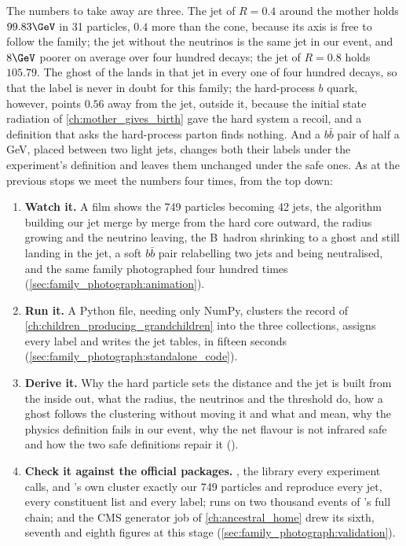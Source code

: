 The numbers to take away are three. The \antikt jet of $R=0.4$ around the
mother holds $99.83\GeV$ in 31 particles, $0.4$ more than the cone,
because its axis is free to follow the family; the jet without the
neutrinos is the same jet in our event, and $8\GeV$ poorer on average over
four hundred decays; the jet of $R=0.8$ holds $105.79$. The ghost of the
\Bbar lands in that jet in every one of four hundred decays, so that the
label is never in doubt for this family; the hard-process $b$ quark,
however, points $0.56$ away from the jet, outside it, because the initial
state radiation of \cref{ch:mother_gives_birth} gave the hard system a
recoil, and a definition that asks the hard-process parton finds nothing.
And a $b\bar b$ pair of half a GeV, placed between two light jets, changes
both their labels under the experiment's definition and leaves them
unchanged under the safe ones. As at the previous stops we meet the
numbers four times, from the top down:
\begin{enumerate}[nosep]
  \item \textbf{Watch it.} A film shows the 749 particles becoming 42 jets,
    the \antikt algorithm building our jet merge by merge from the hard
    core outward, the radius growing and the neutrino leaving, the
    B~hadron shrinking to a ghost and still landing in the jet, a soft
    $b\bar b$ pair relabelling two jets and being neutralised, and the
    same family photographed four hundred times
    (\cref{sec:family_photograph:animation}).
  \item \textbf{Run it.} A Python file, needing only NumPy, clusters the
    record of \cref{ch:children_producing_grandchildren} into the three
    \CMSSW collections, assigns every label and writes the jet tables, in
    fifteen seconds (\cref{sec:family_photograph:standalone_code}).
  \item \textbf{Derive it.} Why the hard particle sets the distance and the
    jet is built from the inside out, what the radius, the neutrinos and
    the threshold do, how a ghost follows the clustering without moving it
    and what \hadflav and \partflav mean, why the physics definition fails
    in our event, why the net flavour is not infrared safe and how the two
    safe definitions repair it
    ().
  \item \textbf{Check it against the official packages.} \FASTJET, the
    library every experiment calls, and \PYTHIA's own 
    cluster exactly our 749 particles and reproduce every jet, every
    constituent list and every label; \FASTJET runs on two thousand events
    of \PYTHIA's full chain; and the CMS generator job of
    \cref{ch:ancestral_home} drew its sixth, seventh and eighth figures at
    this stage (\cref{sec:family_photograph:validation}).
\end{enumerate}

